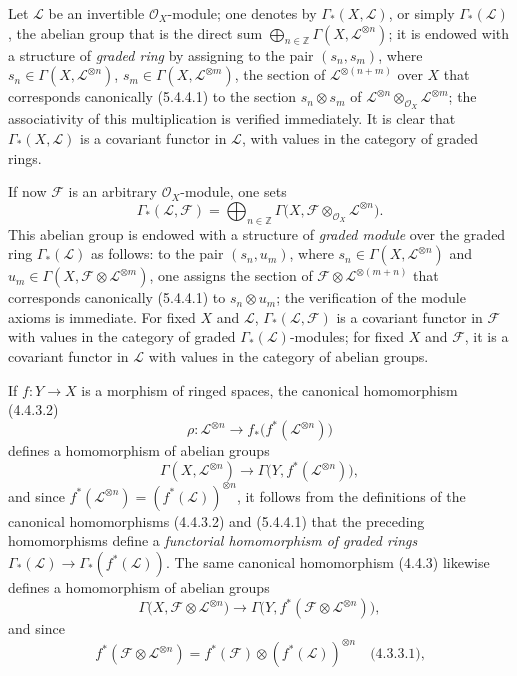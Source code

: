 \begin{env}[5.4.6]
\label{0.5.4.6}
Let $\mathcal{L}$ be an invertible $\mathcal{O}_X$-module; one denotes by
$\Gamma_*(X,\mathcal{L})$, or simply $\Gamma_*(\mathcal{L})$, the abelian
group that is the direct sum
$\bigoplus_{n\in\mathbb{Z}}\Gamma(X,\mathcal{L}^{\otimes n})$; it is endowed
with a structure of \emph{graded ring} by assigning to the pair
$(s_n,s_m)$, where $s_n\in\Gamma(X,\mathcal{L}^{\otimes n})$,
$s_m\in\Gamma(X,\mathcal{L}^{\otimes m})$, the section of
$\mathcal{L}^{\otimes(n+m)}$ over $X$ that corresponds canonically
(5.4.4.1) to the section $s_n\otimes s_m$ of
$\mathcal{L}^{\otimes n}\otimes_{\mathcal{O}_X}\mathcal{L}^{\otimes m}$;
the associativity of this multiplication is verified immediately. It is
clear that $\Gamma_*(X,\mathcal{L})$ is a covariant functor in
$\mathcal{L}$, with values in the category of graded rings.

If now $\mathcal{F}$ is an arbitrary $\mathcal{O}_X$-module, one sets
\[
  \Gamma_*(\mathcal{L},\mathcal{F})
  =\bigoplus_{n\in\mathbb{Z}}
   \Gamma\bigl(X,
     \mathcal{F}\otimes_{\mathcal{O}_X}\mathcal{L}^{\otimes n}\bigr).
\]
This abelian group is endowed with a structure of \emph{graded module} over
the graded ring $\Gamma_*(\mathcal{L})$ as follows: to the pair
$(s_n,u_m)$, where $s_n\in\Gamma(X,\mathcal{L}^{\otimes n})$ and
$u_m\in\Gamma(X,
\mathcal{F}\otimes\mathcal{L}^{\otimes m})$, one
assigns the section of
$\mathcal{F}\otimes\mathcal{L}^{\otimes(m+n)}$ that corresponds
canonically (5.4.4.1) to $s_n\otimes u_m$; the verification of the module
axioms is immediate. For fixed $X$ and $\mathcal{L}$,
$\Gamma_*(\mathcal{L},\mathcal{F})$ is a covariant functor in
$\mathcal{F}$ with values in the category of graded
$\Gamma_*(\mathcal{L})$-modules; for fixed $X$ and $\mathcal{F}$,
it is a covariant functor in $\mathcal{L}$ with values in the category of
abelian groups.

If $f:Y\to X$ is a morphism of ringed spaces, the canonical homomorphism
(4.4.3.2)
\[
  \rho:\mathcal{L}^{\otimes n}
  \longrightarrow
  f_*\bigl(f^*(\mathcal{L}^{\otimes n})\bigr)
\]
defines a homomorphism of abelian groups
\[
  \Gamma(X,\mathcal{L}^{\otimes n})
  \longrightarrow
  \Gamma\bigl(Y,f^*(\mathcal{L}^{\otimes n})\bigr),
\]
and since
$f^*(\mathcal{L}^{\otimes n})=(f^*(\mathcal{L}))^{\otimes n}$, it follows from the
definitions of the canonical homomorphisms (4.4.3.2) and (5.4.4.1) that the
preceding homomorphisms define a \emph{functorial homomorphism
of graded rings}
$\Gamma_*(\mathcal{L})\to\Gamma_*(f^*(\mathcal{L}))$. The same canonical
homomorphism (4.4.3) likewise defines a homomorphism of abelian groups
\[
  \Gamma\bigl(X,
    \mathcal{F}\otimes\mathcal{L}^{\otimes n}\bigr)
  \longrightarrow
  \Gamma\bigl(Y,
    f^*(\mathcal{F}\otimes\mathcal{L}^{\otimes n})\bigr),
\]
and since
\[
  f^*(\mathcal{F}\otimes\mathcal{L}^{\otimes n})
  =f^*(\mathcal{F})\otimes
   (f^*(\mathcal{L}))^{\otimes n}
  \quad\text{(4.3.3.1),}
\]


\end{env}
